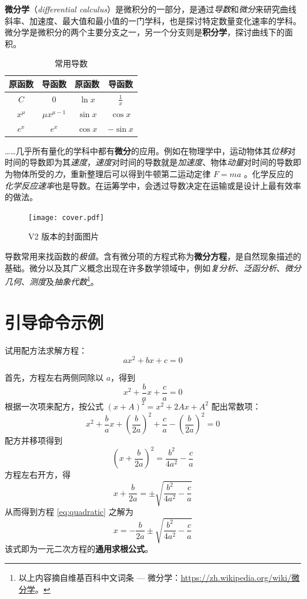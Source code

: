\documentclass[
    10pt,
    oneside,
    openany,
    b5paper,
    colorscheme = basic  %
]{qyxf-book}
\begin{document}
\textbf{微分学}（\emph{differential calculus}）是微积分的一部分，是通过\emph{导数}和\emph{微分}来研究曲线斜率、加速度、最大值和最小值的一门学科，也是探讨特定数量变化速率的学科。微分学是微积分的两个主要分支之一，另一个分支则是\textbf{积分学}，探讨曲线下的面积。


\begin{table}[htbp]
\centering
\caption{常用导数}
\begin{tabular}{cccc}
\toprule
\textbf{原函数} & \textbf{导函数} & \textbf{原函数} & \textbf{导函数} \\
\midrule
$C$ & $0$ & $\ln x$ & $\frac{1}{x}$ \\
$x^\mu$ & $\mu x^{\mu - 1}$ & $\sin x$ & $\cos x$ \\
$e^x$ & $e^x$ & $\cos x$ & $-\sin x$ \\
\bottomrule
\end{tabular}
\end{table}

……几乎所有量化的学科中都有\textbf{微分}的应用。例如在物理学中，运动物体其\emph{位移}对时间的导数即为其\emph{速度}，\emph{速度}对时间的导数就是\emph{加速度}、物体\emph{动量}对时间的导数即为物体所受的\emph{力}，重新整理后可以得到牛顿第二运动定律 $F=ma$ 。化学反应的\emph{化学反应速率}也是导数。在运筹学中，会透过导数决定在运输或是设计上最有效率的做法。

\begin{figure}[htbp]
\centering
\texttt{[image: cover.pdf]}
\caption{V2 版本的封面图片}
\label{fig:qyxf-logo}
\end{figure}

导数常用来找函数的\emph{极值}。含有微分项的方程式称为\textbf{微分方程}，是自然现象描述的基础。微分以及其广义概念出现在许多数学领域中，例如\emph{复分析}、\emph{泛函分析}、\emph{微分几何}、\emph{测度}及\emph{抽象代数}\footnote{以上内容摘自维基百科中文词条 --- 微分学：\url{https://zh.wikipedia.org/wiki/微分学}。}。

\section{引导命令示例}

 试用配方法求解方程：
\begin{equation}\label{eq:quadratic}
ax^2 + bx + c = 0
\end{equation}

\solve 首先，方程左右两侧同除以 $a$，得到
\[ x^2 + \frac bax + \frac ca = 0 \]
根据一次项来配方，按公式 $(x+A)^2=x^2+2Ax+A^2$ 配出常数项：
\[ x^2 + \frac bax + \left(\frac b{2a}\right)^2 + \frac ca - \left(\frac b{2a}\right)^2 = 0 \]
配方并移项得到
\[ \left(x + \frac b{2a}\right)^2 = \frac {b^2}{4a^2} - \frac ca \]
方程左右开方，得
\[ x + \frac b{2a} = \pm \sqrt{\frac {b^2}{4a^2} - \frac ca} \]
从而得到方程 \eqref{eq:quadratic} 之解为
\begin{equation}
x = - \frac b{2a} \pm \sqrt{\frac {b^2}{4a^2} - \frac ca}
\end{equation}
该式即为一元二次方程的\textbf{通用求根公式}。
\end{document}
